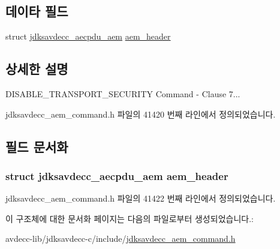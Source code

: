 \subsection*{데이타 필드}
\begin{DoxyCompactItemize}
\item 
struct \hyperlink{structjdksavdecc__aecpdu__aem}{jdksavdecc\+\_\+aecpdu\+\_\+aem} \hyperlink{structjdksavdecc__aem__command__disable__transport__security_ae1e77ccb75ff5021ad923221eab38294}{aem\+\_\+header}
\end{DoxyCompactItemize}


\subsection{상세한 설명}
D\+I\+S\+A\+B\+L\+E\+\_\+\+T\+R\+A\+N\+S\+P\+O\+R\+T\+\_\+\+S\+E\+C\+U\+R\+I\+TY Command -\/ Clause 7... 

jdksavdecc\+\_\+aem\+\_\+command.\+h 파일의 41420 번째 라인에서 정의되었습니다.



\subsection{필드 문서화}
\subsubsection[{\texorpdfstring{aem\+\_\+header}{aem_header}}]{\setlength{\rightskip}{0pt plus 5cm}struct {\bf jdksavdecc\+\_\+aecpdu\+\_\+aem} aem\+\_\+header}\hypertarget{structjdksavdecc__aem__command__disable__transport__security_ae1e77ccb75ff5021ad923221eab38294}{}\label{structjdksavdecc__aem__command__disable__transport__security_ae1e77ccb75ff5021ad923221eab38294}


jdksavdecc\+\_\+aem\+\_\+command.\+h 파일의 41422 번째 라인에서 정의되었습니다.



이 구조체에 대한 문서화 페이지는 다음의 파일로부터 생성되었습니다.\+:\begin{DoxyCompactItemize}
\item 
avdecc-\/lib/jdksavdecc-\/c/include/\hyperlink{jdksavdecc__aem__command_8h}{jdksavdecc\+\_\+aem\+\_\+command.\+h}\end{DoxyCompactItemize}
